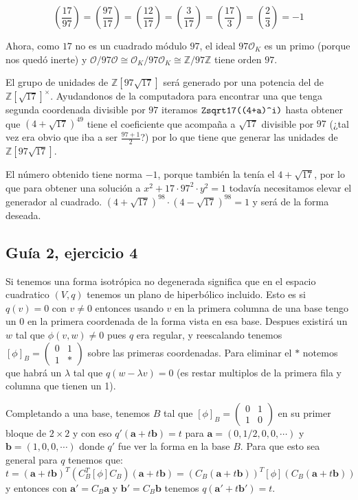 \documentclass[12pt]{amsart}
\newcommand{\ZZ}{\mathbb{Z}}
\newcommand{\aaa}{\mathbf{a}}
\newcommand{\bbb}{\mathbf{b}}
\newcommand{\OO}{\mathcal{O}}
\newcommand{\leg}[2]{\left( \frac{#1}{#2} \right)}
\newcommand{\minimat}[4]{\left(\begin{smallmatrix} #1 & #2 \\ #3 & #4 
\end{smallmatrix}\right)}
\newcommand{\lp}{\left(}
\newcommand{\rp}{\right)}
\newcommand{\lco}{\left[}
\newcommand{\rco}{\right]}
\theoremstyle{plain}
\begin{document}
$$\leg{17}{97} = \leg{97}{17} = \leg{12}{17} = \leg{3}{17} =
\leg{17}{3} = \leg{2}{3} = -1$$

Ahora, como $17$ no es un cuadrado módulo $97$, el ideal 
$97\OO_K$ es un primo (porque nos quedó inerte)
y $\OO/97\OO \cong \OO_K / 97\OO_K \cong\ZZ/97\ZZ$ tiene orden $97$.

El grupo de unidades de $\ZZ[97\sqrt{17}]$ será generado por
una potencia del de $\ZZ[\sqrt{17}]^\times$. Ayudandonos de la 
computadora para encontrar una que tenga segunda coordenada divisible
por $97$ iteramos $\verb|Zsqrt17((4+a)^i)|$ hasta obtener que 
$(4+\sqrt{17})^{49}$ tiene el coeficiente que acompaña a $\sqrt{17}$
divisible por $97$ (¿tal vez era obvio que iba a ser $\frac{97+1}{2}$?)
por lo que tiene que generar las unidades de $\ZZ[97\sqrt{17}]$.

El número obtenido tiene norma $-1$, porque también la tenía el 
$4+\sqrt{17}$, por lo que para obtener una solución a 
$x^2+17\cdot97^2\cdot y^2 = 1$ todavía necesitamos elevar el generador
al cuadrado. 
\hyperref[solucion25]{$(4+\sqrt{17})^{98}\cdot(4-\sqrt{17})^{98} = 1$} 
y será de la forma deseada.

\subsection*{Guía 2, ejercicio 4}

Si tenemos una forma isotrópica no degenerada significa que en el
espacio cuadratico $(V,q)$ tenemos un plano de hiperbólico incluido. 
Esto es si $q(v)=0$ con $v\neq0$ entonces usando $v$ en la primera 
columna de una base tengo un $0$ en la primera coordenada de la forma
vista en esa base. Despues existirá un $w$ tal que $\phi(v,w)\neq0$
pues $q$ era regular, y reescalando tenemos $\lco\phi\rco_B=
\minimat{0}{1}{1}{*}$ sobre las primeras coordenadas. Para eliminar 
el $*$ notemos que habrá un $\lambda$ tal que $q(w-\lambda v)=0$ 
(es restar multiplos de la primera fila y columna que tienen un 1).

Completando a una base, tenemos $B$ tal que $\lco\phi\rco_B=
\minimat{0}{1}{1}{0}$ en su primer bloque de $2\times2$ y con eso 
$q'(\aaa+t\bbb)=t$ para $\aaa=(0,1/2,0,0,\cdots)$ y $\bbb=(1,0,0,
\cdots)$ donde $q'$ fue ver la forma en la base $B$. Para que esto 
sea general para $q$ tenemos que:
$$t=(\aaa +t\bbb )^T \lp C_B^T\lco\phi\rco C_B\rp(\aaa+t\bbb)=
\lp C_B(\aaa+t\bbb)\rp^T\lco\phi\rco \lp C_B(\aaa+t\bbb)\rp$$
y entonces con $\aaa'=C_B\aaa$ y $\bbb'=C_B\bbb$ tenemos $q(\aaa'+
t\bbb')=t$.
\end{document}
